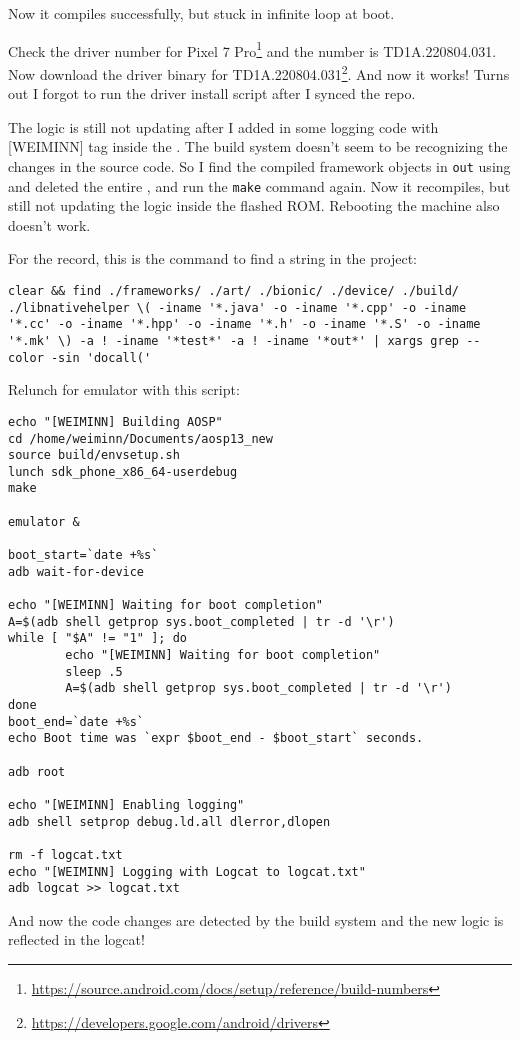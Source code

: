 Now it compiles successfully, but stuck in infinite loop at boot.

Check the driver number for Pixel 7 Pro\footnote{\url{https://source.android.com/docs/setup/reference/build-numbers}} and the number is TD1A.220804.031. Now download the driver binary for TD1A.220804.031\footnote{\url{https://developers.google.com/android/drivers}}. And now it works! Turns out I forgot to run the driver install script after I synced the repo.

The logic is still not updating after I added in some logging code with [WEIMINN] tag inside the . The build system doesn't seem to be recognizing the changes in the source code. So I find the compiled framework objects in \texttt{out} using  and deleted the entire , and run the \texttt{make} command again. Now it recompiles, but still not updating the logic inside the flashed ROM. Rebooting the machine also doesn't work.

For the record, this is the command to find a string in the project:
\begin{lstlisting}
clear && find ./frameworks/ ./art/ ./bionic/ ./device/ ./build/ ./libnativehelper \( -iname '*.java' -o -iname '*.cpp' -o -iname '*.cc' -o -iname '*.hpp' -o -iname '*.h' -o -iname '*.S' -o -iname '*.mk' \) -a ! -iname '*test*' -a ! -iname '*out*' | xargs grep --color -sin 'docall('
\end{lstlisting}

Relunch for emulator with this script:
\begin{lstlisting}
echo "[WEIMINN] Building AOSP"
cd /home/weiminn/Documents/aosp13_new
source build/envsetup.sh
lunch sdk_phone_x86_64-userdebug
make

emulator &

boot_start=`date +%s`
adb wait-for-device

echo "[WEIMINN] Waiting for boot completion"
A=$(adb shell getprop sys.boot_completed | tr -d '\r')
while [ "$A" != "1" ]; do
        echo "[WEIMINN] Waiting for boot completion"
        sleep .5
        A=$(adb shell getprop sys.boot_completed | tr -d '\r')
done
boot_end=`date +%s`
echo Boot time was `expr $boot_end - $boot_start` seconds.

adb root

echo "[WEIMINN] Enabling logging"
adb shell setprop debug.ld.all dlerror,dlopen

rm -f logcat.txt 
echo "[WEIMINN] Logging with Logcat to logcat.txt"
adb logcat >> logcat.txt    
\end{lstlisting}
And now the code changes are detected by the build system and the new logic is reflected in the logcat!


